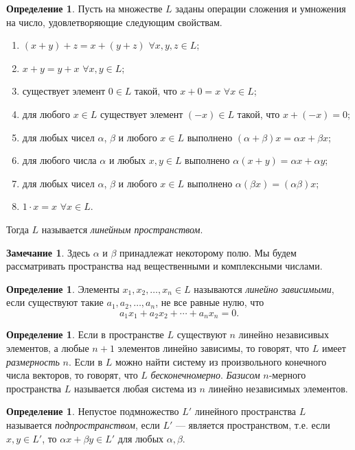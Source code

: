 \documentclass[12pt, titlepage, oneside]{amsbook}
\theoremstyle{definition}
\newtheorem{definition}[theorem]{Определение}
\newtheorem{remark}[theorem]{Замечание}
\theoremstyle{remark}
\begin{document}
\begin{definition}
Пусть на множестве $L$ заданы операции сложения и умножения на число, удовлетворяющие следующим свойствам.
\begin{enumerate}
\item $(x+y)+z=x+(y+z)$ $\forall x,y,z\in L$;
\item $x+y=y+x$ $\forall x,y\in L$;
\item существует элемент $0\in L$ такой, что $x+0=x$ $\forall x\in L$;
\item для любого $x\in L$ существует элемент $(-x)\in L$ такой, что $x+(-x)=0$;
\item для любых чисел $\alpha$, $\beta$ и любого $x\in L$ выполнено $(\alpha+\beta)x=\alpha x+\beta x$;
\item для любого числа $\alpha$ и любых $x,y\in L$ выполнено $\alpha(x+y)=\alpha x+\alpha y$;
\item для любых чисел $\alpha$, $\beta$ и любого $x\in L$ выполнено $\alpha(\beta x)=(\alpha\beta) x$;
\item $1\cdot x=x$ $\forall x\in L$.
\end{enumerate}
Тогда $L$ называется \emph{линейным пространством}.
\end{definition}


\begin{remark}
Здесь $\alpha$ и $\beta$ принадлежат некоторому полю. Мы будем рассматривать пространства над вещественными и комплексными числами.
\end{remark}

\begin{definition}
Элементы $x_1,x_2,\ldots, x_n\in L$ называются \emph{линейно зависимыми}, если существуют такие $a_1,a_2,\ldots, a_n$, не все равные нулю, что $$a_1x_1+a_2x_2+\cdots+a_nx_n=0.$$
\end{definition}

\begin{definition}
Если в пространстве $L$ существуют $n$ линейно независивых элементов, а любые $n+1$ элементов линейно зависимы, то говорят, что $L$ имеет \emph{размерность} $n$. Если в $L$ можно найти систему из произвольного конечного числа векторов, то говорят, что $L$ \emph{бесконечномерно}. \emph{Базисом} $n$-мерного пространства $L$ называется любая система из $n$ линейно независимых элементов.
\end{definition}

\begin{definition}
Непустое подмножество $L'$ линейного пространства $L$ называется \emph{подпространством}, если $L'$ --- является пространством, т.е. если $x,y\in L'$, то $\alpha x+\beta y\in L'$ для любых $\alpha,\beta$.
\end{definition}
\end{document}

